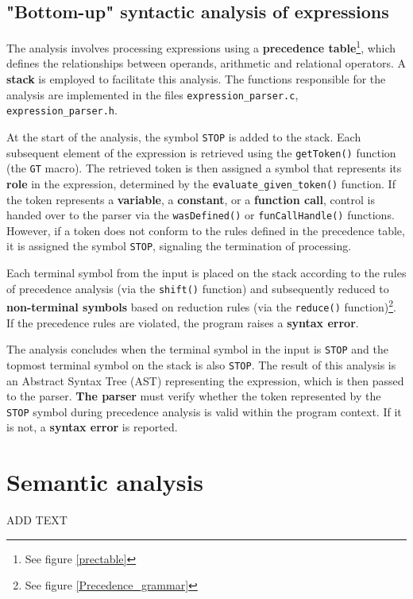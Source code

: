 \documentclass[a4paper, 11pt]{article}
\begin{document}
\subsection{"Bottom-up" syntactic analysis of expressions}\label{sec:EXPRPARSER}
The analysis involves processing expressions using a \textbf{precedence table}\footnote{See figure \ref{prectable}}, which defines the relationships between operands, arithmetic 
and relational operators. A \textbf{stack} is employed to facilitate this analysis. The functions responsible for the analysis are implemented 
in the files \verb|expression_parser.c|, \verb|expression_parser.h|.
\par
At the start of the analysis, the symbol \verb|STOP| is added to the stack. Each subsequent element of the expression is retrieved using the \verb|getToken()| 
function (the \verb|GT| macro). The retrieved token is then assigned a symbol that represents its \textbf{role} in the expression, determined by the 
\verb|evaluate_given_token()| function. If the token represents a \textbf{variable}, a \textbf{constant}, or a \textbf{function call}, control is handed 
over to the parser via the \verb|wasDefined()| or \verb|funCallHandle()| functions. However, if a token does not conform to the rules defined in the precedence 
table, it is assigned the symbol \verb|STOP|, signaling the termination of processing.
\par
Each terminal symbol from the input is placed on the stack according to the rules of precedence analysis 
(via the \verb|shift()| function) and subsequently reduced to \textbf{non-terminal symbols} based on reduction rules (via the \verb|reduce()| function)\footnote{See figure \ref{Precedence_grammar}}. 
If the precedence rules are violated, the program raises a \textbf{syntax error}.
\par
The analysis concludes when the terminal symbol in the input is \verb|STOP| and the topmost terminal symbol 
on the stack is also \verb|STOP|. The result of this analysis is an Abstract Syntax Tree (AST) representing the expression, 
which is then passed to the parser. \textbf{The parser} must verify whether the token represented by the \verb|STOP| symbol 
during precedence analysis is valid within the program context. If it is not, a \textbf{syntax error} is reported.

\section{Semantic analysis}\label{sec:SEMANTIC}
ADD TEXT
\end{document}
